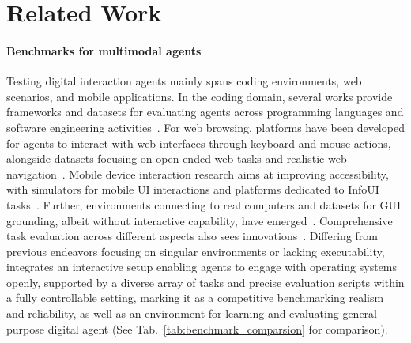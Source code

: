 \section{Related Work}
\label{sec:related}

\paragraph{Benchmarks for multimodal agents}
Testing digital interaction agents mainly spans coding environments, web scenarios, and mobile applications. In the coding domain, several works provide frameworks and datasets for evaluating agents across programming languages and software engineering activities~\citep{yang2023intercode, jimenez2023swe, li2024devbench, si2024design2code}. 
For web browsing, platforms have been developed for agents to interact with web interfaces through keyboard and mouse actions, alongside datasets focusing on open-ended web tasks and realistic web navigation~\citep{shi2017world, liu2018reinforcement, yao2022webshop, deng2023mind2web, zhou2023webarena, Koh2024VisualWebArenaEM, drouin2024workarena}.
Mobile device interaction research aims at improving accessibility, with simulators for mobile UI interactions and platforms dedicated to InfoUI tasks~\citep{li2020mapping, sun2022meta, venkatesh2022ugif, toyama2021androidenv, rawles2023android, zhang2023mobile, wen2023empowering, zhang2023appagent, wang2024mobile}. 
Further, environments connecting to real computers and datasets for GUI grounding, albeit without interactive capability, have emerged~\citep{gao2023assistgui, Cheng2024SeeClickHG, niu2024screenagent, Kapoor2024OmniACTAD, tan2024towards}. 
Comprehensive task evaluation across different aspects also sees innovations~\citep{liu2023agentbench, mialon2023gaia}.
Differing from previous endeavors focusing on singular environments or lacking executability, \ours integrates an interactive setup enabling agents to engage with operating systems openly, supported by a diverse array of tasks and precise evaluation scripts within a fully controllable setting, marking it as a competitive benchmarking realism and reliability, as well as an environment for learning and evaluating general-purpose digital agent (See Tab.~\ref{tab:benchmark_comparsion} for comparison).


